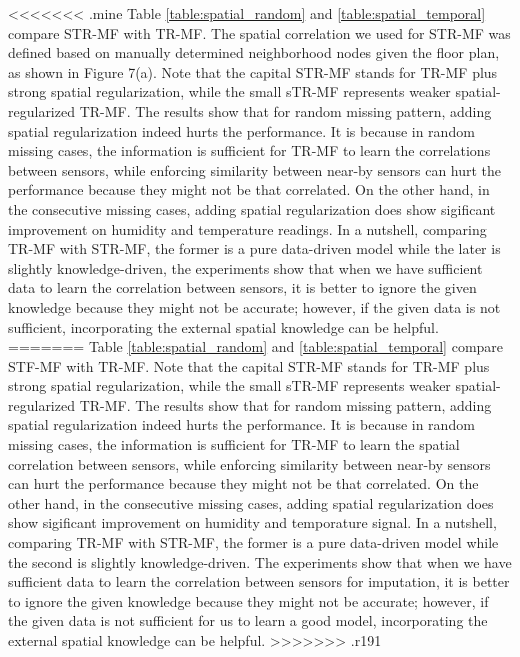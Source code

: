 <<<<<<< .mine
Table \ref{table:spatial_random} and \ref{table:spatial_temporal} compare STR-MF with TR-MF.  The spatial correlation we used for STR-MF was defined based on manually determined neighborhood nodes given the floor plan, as shown in Figure 7(a). 
Note that the capital STR-MF stands for TR-MF plus strong spatial regularization, while the small sTR-MF represents weaker spatial-regularized TR-MF. The results show that for random missing pattern, adding spatial regularization indeed hurts the performance. It is because in random missing cases, the information is sufficient for TR-MF to learn the correlations between sensors, while enforcing similarity between near-by sensors can hurt the performance because they might not be that correlated. On the other hand, in the consecutive missing cases, adding spatial regularization does show sigificant improvement on humidity and temperature readings. In a nutshell, comparing TR-MF with STR-MF, the former is a pure data-driven model while the later is slightly knowledge-driven, the experiments show that when we have sufficient data to learn the correlation between sensors, it is better to ignore the given knowledge because they might not be accurate; however, if the given data is not sufficient, incorporating the external spatial knowledge can be helpful.
=======
Table \ref{table:spatial_random} and \ref{table:spatial_temporal} compare STF-MF with TR-MF.
Note that the capital STR-MF stands for TR-MF plus strong spatial regularization, while the small sTR-MF represents weaker spatial-regularized TR-MF. The results show that for random missing pattern, adding spatial regularization indeed hurts the performance. It is because in random missing cases, the information is sufficient for TR-MF to learn the spatial correlation between sensors, while enforcing similarity between near-by sensors can hurt the performance because they might not be that correlated. On the other hand, in the consecutive missing cases, adding spatial regularization does show sigificant improvement on humidity and temporature signal. In a nutshell, comparing TR-MF with STR-MF, the former is a pure data-driven model while the second is slightly knowledge-driven. The experiments show that when we have sufficient data to learn the correlation between sensors for imputation, it is better to ignore the given knowledge because they might not be accurate; however, if the given data is not sufficient for us to learn a good model, incorporating the external spatial knowledge can be helpful.
>>>>>>> .r191

